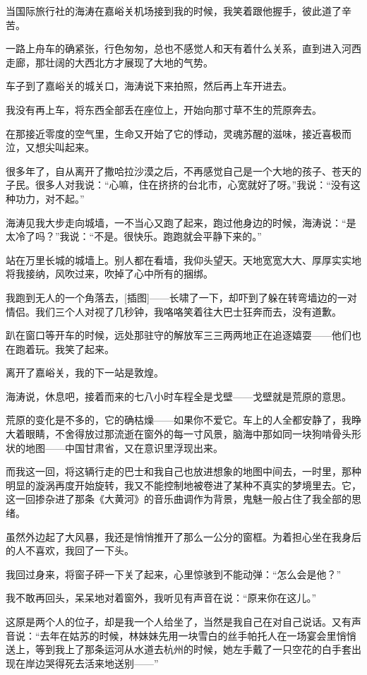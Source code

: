 \par 当国际旅行社的海涛在嘉峪关机场接到我的时候，我笑着跟他握手，彼此道了辛苦。
\par 一路上舟车的确紧张，行色匆匆，总也不感觉人和天有着什么关系，直到进入河西走廊，那壮阔的大西北方才展现了大地的气势。
\par 车子到了嘉峪关的城关口，海涛说下来拍照，然后再上车开进去。
\par 我没有再上车，将东西全部丢在座位上，开始向那寸草不生的荒原奔去。
\par 在那接近零度的空气里，生命又开始了它的悸动，灵魂苏醒的滋味，接近喜极而泣，又想尖叫起来。
\par 很多年了，自从离开了撒哈拉沙漠之后，不再感觉自己是一个大地的孩子、苍天的子民。很多人对我说：“心嘛，住在挤挤的台北市，心宽就好了呀。”我说：“没有这种功力，对不起。”
\par 海涛见我大步走向城墙，一不当心又跑了起来，跑过他身边的时候，海涛说：“是太冷了吗？”我说：“不是。很快乐。跑跑就会平静下来的。”
\par 站在万里长城的城墙上。别人都在看墙，我仰头望天。天地宽宽大大、厚厚实实地将我接纳，风吹过来，吹掉了心中所有的捆绑。
\par 我跑到无人的一个角落去，[插图]——长啸了一下，却吓到了躲在转弯墙边的一对情侣。我们三个人对视了几秒钟，我咯咯笑着往大巴士狂奔而去，没有道歉。
\par 趴在窗口等开车的时候，远处那驻守的解放军三三两两地正在追逐嬉耍——他们也在跑着玩。我笑了起来。
\par 
\par 离开了嘉峪关，我的下一站是敦煌。
\par 海涛说，休息吧，接着而来的七八小时车程全是戈壁——戈壁就是荒原的意思。
\par 荒原的变化是不多的，它的确枯燥——如果你不爱它。车上的人全都安静了，我睁大着眼睛，不舍得放过那流逝在窗外的每一寸风景，脑海中那如同一块狗啃骨头形状的地图——中国甘肃省，又在意识里浮现出来。
\par 而我这一回，将这辆行走的巴士和我自己也放进想象的地图中间去，一时里，那种明显的漩涡再度开始旋转，我又不能控制地被卷进了某种不真实的梦境里去。它，这一回掺杂进了那条《大黄河》的音乐曲调作为背景，鬼魅一般占住了我全部的思绪。
\par 虽然外边起了大风暴，我还是悄悄推开了那么一公分的窗框。为着担心坐在我身后的人不喜欢，我回了一下头。
\par 我回过身来，将窗子砰一下关了起来，心里惊骇到不能动弹：“怎么会是他？”
\par 我不敢再回头，呆呆地对着窗外，我听见有声音在说：“原来你在这儿。”
\par 这原是两个人的位子，却是我一个人给坐了，当然是我自己在对自己说话。又有声音说：“去年在姑苏的时候，林妹妹先用一块雪白的丝手帕托人在一场宴会里悄悄送上，等到我上了那条运河从水道去杭州的时候，她左手戴了一只空花的白手套出现在岸边哭得死去活来地送别——”
